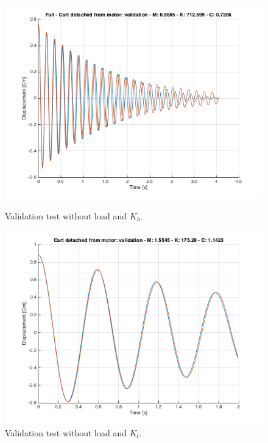 \begin{figure} [!h]
\begin{minipage}[t]{0.45\textwidth}
\includegraphics[width=\linewidth]{img/validation_m_kh_full.png}
\caption{Validation test without load and $K_h$.}
\label{fig:val1_1}
\end{minipage}
\hspace{\fill}
\begin{minipage}[t]{0.45\textwidth}
\includegraphics[width=\linewidth]{img/validation_ml_kl_partial.png}
\caption{Validation test without load and $K_l$.}
\label{fig:val1_2}
\end{minipage}


\end{figure}
